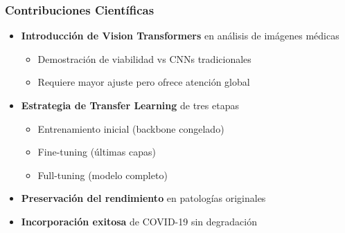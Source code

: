 
\begin{frame}
\frametitle{Contribuciones Científicas}
\begin{itemize}
    \item \textbf{Introducción de Vision Transformers} en análisis de imágenes médicas
    \begin{itemize}
        \item Demostración de viabilidad vs CNNs tradicionales
        \item Requiere mayor ajuste pero ofrece atención global
    \end{itemize}
    \item \textbf{Estrategia de Transfer Learning} de tres etapas
    \begin{itemize}
        \item Entrenamiento inicial (backbone congelado)
        \item Fine-tuning (últimas capas)
        \item Full-tuning (modelo completo)
    \end{itemize}
    \item \textbf{Preservación del rendimiento} en patologías originales
    \item \textbf{Incorporación exitosa} de COVID-19 sin degradación
\end{itemize}
\end{frame}


